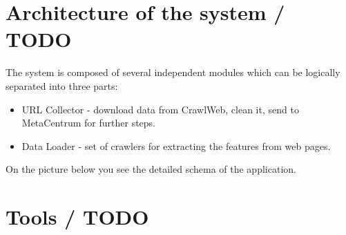 \section{Architecture of the system / TODO}
The system is composed of several independent modules which can be logically separated into three parts:

\begin{itemize}
    \item URL Collector - download data from CrawlWeb, clean it, send to MetaCentrum for further steps.
    \item Data Loader - set of crawlers for extracting the features from web pages. 
\end{itemize}
On the picture below you see the detailed schema of the application. 
\section{Tools / TODO}